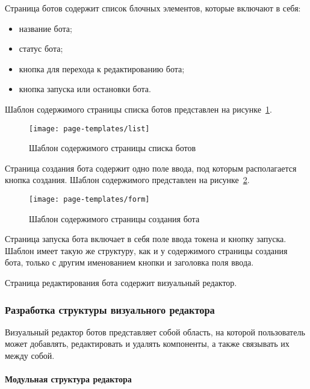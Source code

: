 Страница ботов содержит список блочных элементов, которые
включают в себя:
\begin{itemize}
	\item название бота;
	\item статус бота;
	\item кнопка для перехода к редактированию бота;
	\item кнопка запуска или остановки бота.
\end{itemize}

Шаблон содержимого страницы списка ботов представлен на
рисунке~\ref{f:list-template}.

\begin{figure}[ht]
	\centering
	\vspace{0.5cm}
	\texttt{[image: page-templates/list]}
	\caption{Шаблон содержимого страницы списка ботов}
	\label{f:list-template}
\end{figure}

Страница создания бота содержит одно поле ввода, под которым
располагается кнопка создания. Шаблон содержимого представлен на
рисунке~\ref{f:form-template}.


\begin{figure}[ht]
	\centering
	\vspace{0.5cm}
	\texttt{[image: page-templates/form]}
	\caption{Шаблон содержимого страницы создания бота}
	\label{f:form-template}
\end{figure}

Страница запуска бота включает в себя поле ввода токена и кнопку
запуска. Шаблон имеет такую же структуру, как и у содержимого страницы создания бота,
только с другим именованием кнопки и заголовка поля ввода.

Страница редактирования бота содержит визуальный редактор.

\subsubsection{Разработка структуры визуального редактора}

Визуальный редактор ботов представляет собой область, на которой
пользователь может добавлять, редактировать и удалять компоненты, а также
связывать их между собой.

\paragraph{Модульная структура редактора}


